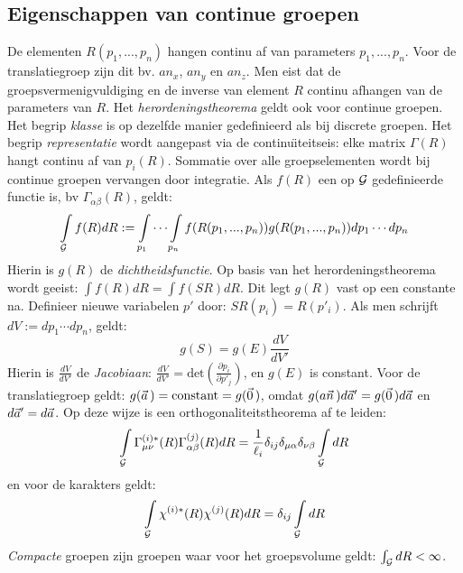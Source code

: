 \subsection{Eigenschappen van continue groepen}
De elementen $R(p_1,...,p_n)$ hangen continu af van parameters $p_1,...,p_n$.
Voor de translatiegroep zijn dit bv. $an_x$, $an_y$ en $an_z$. Men eist dat
de groepsvermenigvuldiging en de inverse van element $R$ continu afhangen van
de parameters van $R$.
\npar
Het {\it herordeningstheorema} geldt ook voor continue groepen. Het begrip
{\it klasse} is op dezelfde manier gedefinieerd als bij discrete groepen.
Het begrip {\it representatie} wordt aangepast via de continu\"{\i}teitseis: elke
matrix $\Gamma(R)$ hangt continu af van $p_i(R)$.
\npar
Sommatie over alle groepselementen wordt bij continue groepen vervangen door
integratie. Als $f(R)$ een op ${\cal{G}}$ gedefinieerde functie is, bv $\Gamma_{\alpha\beta}(R)$,
geldt:
\[
\int\limits_{{\cal{G}}}f(R)dR:=\int\limits_{p_1}\cdots\int\limits_{p_n}
f(R(p_1,...,p_n))g(R(p_1,...,p_n))dp_1\cdots dp_n
\]
Hierin is $g(R)$ de {\it dichtheidsfunctie}.
\npar
Op basis van het herordeningstheorema wordt geeist: $\int f(R)dR=\int f(SR)dR$.
Dit legt $g(R)$ vast op een constante na. Definieer nieuwe variabelen $p'$
door: $SR(p_i)=R(p'_i)$. Als men schrijft $dV:=dp_1\cdots dp_n$, geldt:
\[
g(S)=g(E)\frac{dV}{dV'}
\]
Hierin is $\displaystyle\frac{dV}{dV'}$ de {\it Jacobiaan}:
$\displaystyle \frac{dV}{dV'}=\mbox{det}\left(\frac{\partial p_i}{\partial p'_j}\right)$,
en $g(E)$ is constant.
\npar
Voor de translatiegroep geldt: $g(\vec{a}\,)=\mbox{constant}=g(\vec{0}\,)$,
omdat $g(a\vec{n}\,)d\vec{a}'=g(\vec{0}\,)d\vec{a}$ en $d\vec{a}'=d\vec{a}$.
\npar
Op deze wijze is een orthogonaliteitstheorema af te leiden:
\[
\int\limits_{{\cal{G}}}\Gamma^{(i)*}_{\mu\nu}(R)\Gamma^{(j)}_{\alpha\beta}(R)dR=
\frac{1}{\ell_i}\delta_{ij}\delta_{\mu\alpha}\delta_{\nu\beta}\int\limits_{{\cal{G}}}dR
\]
en voor de karakters geldt:
\[
\int\limits_{{\cal{G}}}\chi^{(i)*}(R)\chi^{(j)}(R)dR=\delta_{ij}\int\limits_{{\cal{G}}}dR
\]
{\it Compacte} groepen zijn groepen waar voor het groepsvolume geldt:
$\int_{{\cal{G}}}dR<\infty$.

